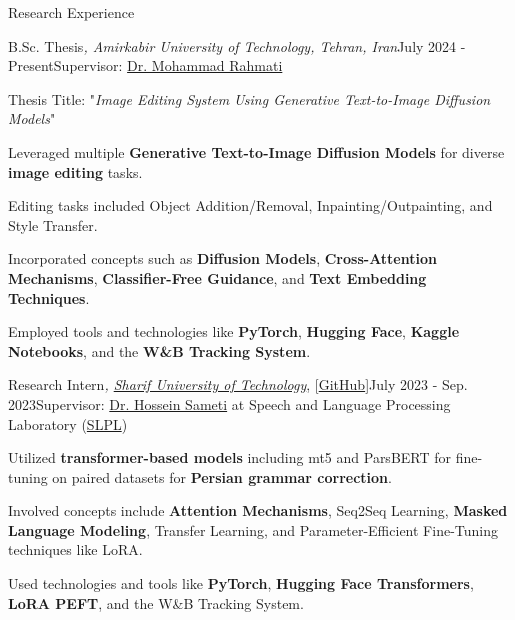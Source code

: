 \documentclass{resume}
\begin{document}
\begin{rSection}{Research Experience}
    \begin{rSubsection}{B.Sc. Thesis\textnormal{\textit{, Amirkabir University of Technology, Tehran, Iran}}}{July 2024 - Present}{Supervisor: \href{https://scholar.google.com/citations?user=EYk7M80AAAAJ&hl=en}{Dr. Mohammad Rahmati}}{}
        \item Thesis Title: "\textit{Image Editing System Using Generative Text-to-Image Diffusion Models}"
        \item Leveraged multiple {\bf Generative Text-to-Image Diffusion Models} for diverse {\bf image editing} tasks.
        \item Editing tasks included Object Addition/Removal, Inpainting/Outpainting, and Style Transfer.
        \item Incorporated concepts such as {\bf Diffusion Models}, {\bf Cross-Attention Mechanisms}, {\bf Classifier-Free Guidance}, and {\bf Text Embedding Techniques}.
        \item Employed tools and technologies like {\bf PyTorch}, {\bf Hugging Face}, {\bf Kaggle Notebooks}, and the {\bf W\&B Tracking System}.
    \end{rSubsection}

    \begin{rSubsection}{Research Intern\textnormal{\textit{, \href{URLhttps://www.topuniversities.com/universities/sharif-university-technology}{Sharif University of Technology}}}, \textnormal{[\href{https://github.com/sepehrNoey/persian-Grammatical-Error-Correction}{GitHub}]}}{July 2023 - Sep. 2023}{Supervisor: \href{https://scholar.google.com/citations?user=ebEhWZwAAAAJ&hl=en}{Dr. Hossein Sameti} at Speech and Language Processing Laboratory (\href{https://slpl.ce.sharif.ir/en/home}{SLPL})}{}
        \item Utilized {\bf transformer-based models} including mt5 and ParsBERT for fine-tuning on paired datasets for {\bf Persian grammar correction}.
        \item Involved concepts include {\bf Attention Mechanisms}, Seq2Seq Learning, {\bf Masked Language Modeling}, Transfer Learning, and Parameter-Efficient Fine-Tuning techniques like LoRA.
        \item Used technologies and tools like {\bf PyTorch}, {\bf Hugging Face Transformers}, {\bf LoRA PEFT}, and the W\&B Tracking System.
    \end{rSubsection}
\end{rSection}
\end{document}
